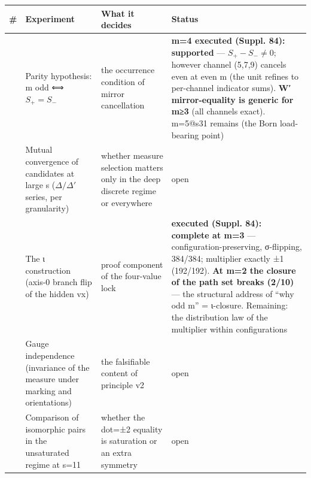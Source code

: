 \documentclass[
]{ltjsarticle}
\newcounter{none} %
\begin{document}
{\def\LTcaptype{none} %
\begin{longtable}[]{@{}
  >{\raggedright\arraybackslash}p{}
  >{\raggedright\arraybackslash}p{}
  >{\raggedright\arraybackslash}p{}
  >{\raggedright\arraybackslash}p{}@{}}
\toprule\noalign{}
\begin{minipage}[b]{\linewidth}\raggedright
\#
\end{minipage} & \begin{minipage}[b]{\linewidth}\raggedright
Experiment
\end{minipage} & \begin{minipage}[b]{\linewidth}\raggedright
What it decides
\end{minipage} & \begin{minipage}[b]{\linewidth}\raggedright
Status
\end{minipage} \\
\midrule\noalign{}
\endhead
\bottomrule\noalign{}
\endlastfoot
1 & Parity hypothesis: m odd ⟺ \(S_+=S_-\) & the occurrence condition of
mirror cancellation & \textbf{m=4 executed (Suppl. 84): supported} ---
\(S_+-S_-\neq0\); however channel (5,7,9) cancels even at even m (the
unit refines to per-channel indicator sums). \textbf{W′ mirror-equality
is generic for m≥3} (all channels exact). m=5@s31 remains (the Born
load-bearing point) \\
2 & Mutual convergence of candidates at large s (\(\Delta/\Delta'\)
series, per granularity) & whether measure selection matters only in the
deep discrete regime or everywhere & open \\
3 & The ι construction (axis-0 branch flip of the hidden vx) & proof
component of the four-value lock & \textbf{executed (Suppl. 84):
complete at m=3} --- configuration-preserving, σ-flipping, 384/384;
multiplier exactly ±1 (192/192). \textbf{At m=2 the closure of the path
set breaks (2/10)} --- the structural address of ``why odd m'' =
ι-closure. Remaining: the distribution law of the multiplier within
configurations \\
4 & Gauge independence (invariance of the measure under marking and
orientations) & the falsifiable content of principle v2 & open \\
5 & Comparison of isomorphic pairs in the unsaturated regime at s=11 &
whether the dot=±2 equality is saturation or an extra symmetry & open \\
\end{longtable}
}
\end{document}
